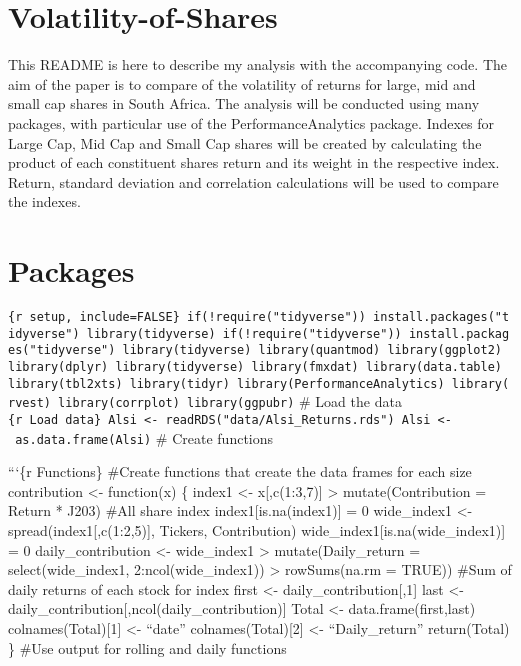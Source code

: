 \documentclass[
]{article}
\author{}
\date{\vspace{-2.5em}}
\begin{document}
\hypertarget{volatility-of-shares}{%
\section{Volatility-of-Shares}\label{volatility-of-shares}}

This README is here to describe my analysis with the accompanying code.
The aim of the paper is to compare of the volatility of returns for
large, mid and small cap shares in South Africa. The analysis will be
conducted using many packages, with particular use of the
PerformanceAnalytics package. Indexes for Large Cap, Mid Cap and Small
Cap shares will be created by calculating the product of each
constituent shares return and its weight in the respective index.
Return, standard deviation and correlation calculations will be used to
compare the indexes.

\hypertarget{packages}{%
\section{Packages}\label{packages}}

\texttt{\{r\ setup,\ include=FALSE\}\ if(!require("tidyverse"))\ install.packages("tidyverse")\ library(tidyverse)\ if(!require("tidyverse"))\ install.packages("tidyverse")\ library(tidyverse)\ library(quantmod)\ library(ggplot2)\ library(dplyr)\ library(tidyverse)\ library(fmxdat)\ library(data.table)\ library(tbl2xts)\ library(tidyr)\ library(PerformanceAnalytics)\ library(rvest)\ library(corrplot)\ library(ggpubr)}
\# Load the data
\texttt{\{r\ Load\ data\}\ Alsi\ \textless{}-\ readRDS("data/Alsi\_Returns.rds")\ Alsi\ \textless{}-\ as.data.frame(Alsi)}
\# Create functions

```\{r Functions\} \#Create functions that create the data frames for
each size contribution \textless- function(x) \{ index1 \textless-
x{[},c(1:3,7){]} \textbar\textgreater{} mutate(Contribution = Return *
J203) \#All share index index1{[}is.na(index1){]} = 0 wide\_index1
\textless- spread(index1{[},c(1:2,5){]}, Tickers, Contribution)
wide\_index1{[}is.na(wide\_index1){]} = 0 daily\_contribution \textless-
wide\_index1 \textbar\textgreater{} mutate(Daily\_return =
select(wide\_index1, 2:ncol(wide\_index1)) \textbar\textgreater{}
rowSums(na.rm = TRUE)) \#Sum of daily returns of each stock for index
first \textless- daily\_contribution{[},1{]} last \textless-
daily\_contribution{[},ncol(daily\_contribution){]} Total \textless-
data.frame(first,last) colnames(Total){[}1{]} \textless- ``date''
colnames(Total){[}2{]} \textless- ``Daily\_return'' return(Total) \}
\#Use output for rolling and daily functions
\end{document}
